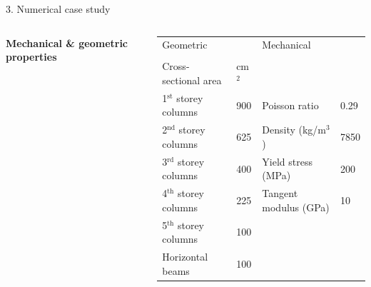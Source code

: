 \documentclass[10pt,xcolor = dvipsnames]{beamer}
\begin{document}
\begin{frame}[t]{3. Numerical case study}
\begin{columns}
\scriptsize

{\bf Mechanical \& geometric properties}
\begin{spacing}{1.2}
\begin{tabular}{llll}\hline
\multicolumn{2}{l}{Geometric}& \multicolumn{2}{l}{Mechanical}\\[-6pt]
\multicolumn{2}{l}{\hrulefill}& & \\
Cross-sectional area & \hspace{-0.2cm} cm$^2$ & & \\\hline
1$^{\text{st}}$ storey columns & \hspace{-0.2cm} 900 & Poisson ratio & \hspace{-0.2cm} 0.29 \\
2$^{\text{nd}}$ storey columns & \hspace{-0.2cm} 625 & Density (kg/m$^3$)  & \hspace{-0.2cm} 7850\\
3$^{\text{rd}}$ storey columns & \hspace{-0.2cm} 400 & Yield stress (MPa) & \hspace{-0.2cm} 200\\
4$^{\text{th}}$ storey columns & \hspace{-0.2cm} 225 & Tangent modulus (GPa) & \hspace{-0.2cm} 10 \\
5$^{\text{th}}$ storey columns & \hspace{-0.2cm} 100 & & \\ 
Horizontal beams & \hspace{-0.2cm} 100 & & \\\hline
\end{tabular}
\end{spacing}





\end{columns}

\end{frame}
\end{document}
